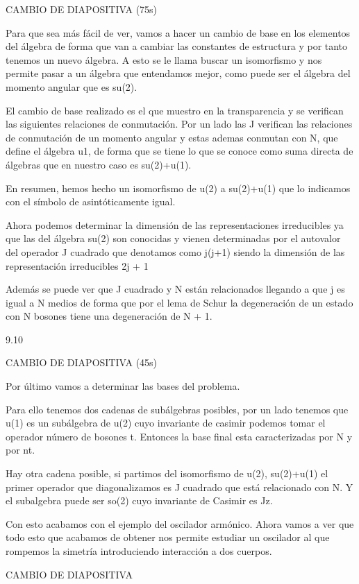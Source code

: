 \documentclass[a4paper,12pt,twoside]{article}
\begin{document}
CAMBIO DE DIAPOSITIVA (75s)

Para que sea más fácil de ver, vamos a hacer un cambio de base en los elementos del álgebra de forma que van a cambiar las constantes de estructura y por tanto tenemos un nuevo álgebra. A esto se le llama buscar un isomorfismo y nos permite pasar a un álgebra que entendamos mejor, como puede ser el álgebra del momento angular que es su(2).

El cambio de base realizado es el que muestro en la transparencia y se verifican las siguientes relaciones de conmutación. Por un lado las J verifican las relaciones de conmutación de un momento angular y estas ademas conmutan con N, que define el álgebra u1, de forma que se tiene lo que se conoce como suma directa de álgebras que en nuestro caso es su(2)+u(1). 

En resumen, hemos hecho un isomorfismo de u(2) a su(2)+u(1) que lo indicamos con el símbolo de asintóticamente igual.

Ahora podemos determinar la dimensión de las representaciones irreducibles ya que las del álgebra su(2) son conocidas y vienen determinadas por el autovalor del operador J cuadrado que denotamos como j(j+1) siendo la dimensión de las representación irreducibles 2j + 1

Además se puede ver que J cuadrado y N están relacionados llegando a que j es igual a N medios de forma que por el lema de Schur la degeneración de un estado con N bosones tiene una degeneración de N + 1.

9.10

CAMBIO DE DIAPOSITIVA (45s)

Por último vamos a determinar las bases del problema.

Para ello tenemos dos cadenas de subálgebras posibles, por un lado tenemos que u(1) es un subálgebra de u(2) cuyo invariante de casimir podemos tomar el operador número de bosones t. Entonces la base final esta caracterizadas por N y por nt.

Hay otra cadena posible, si partimos del isomorfismo de u(2), su(2)+u(1) el primer operador que diagonalizamos es J cuadrado que está relacionado con N. Y el subalgebra puede ser so(2) cuyo invariante de Casimir es Jz.

Con esto acabamos con el ejemplo del oscilador armónico. Ahora vamos a ver que todo esto que acabamos de obtener nos permite estudiar un oscilador al que rompemos la simetría introduciendo interacción a dos cuerpos.

CAMBIO DE DIAPOSITIVA
\end{document}
